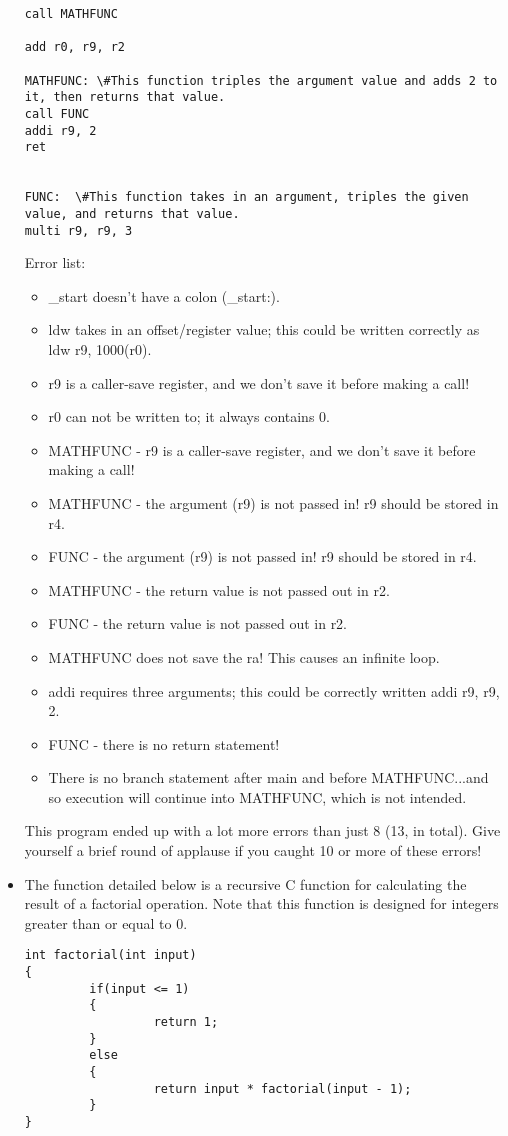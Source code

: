 \documentclass[10pt]{article}
\begin{document}
\begin{itemize}
\begin{verbatim}
call MATHFUNC

add r0, r9, r2

MATHFUNC: \#This function triples the argument value and adds 2 to it, then returns that value.
call FUNC
addi r9, 2
ret


FUNC:  \#This function takes in an argument, triples the given value, and returns that value.
multi r9, r9, 3
    \end{verbatim}

Error list:
\begin{itemize}
\item \_start doesn't have a colon (\_start:).
\item ldw takes in an offset/register value; this could be written correctly as ldw r9, 1000(r0).
\item r9 is a caller-save register, and we don't save it before making a call!
\item r0 can not be written to; it always contains 0.
\item MATHFUNC - r9 is a caller-save register, and we don't save it before making a call!
\item MATHFUNC - the argument (r9) is not passed in!  r9 should be stored in r4.
\item FUNC - the argument (r9) is not passed in!  r9 should be stored in r4.
\item MATHFUNC - the return value is not passed out in r2.
\item FUNC - the return value is not passed out in r2.
\item MATHFUNC does not save the ra!  This causes an infinite loop.
\item addi requires three arguments; this could be correctly written addi r9, r9, 2.
\item FUNC - there is no return statement!
\item There is no branch statement after main and before MATHFUNC...and so execution will continue into MATHFUNC, which is not intended.

\end{itemize}

This program ended up with a lot more errors than just 8 (13, in total).  Give yourself a brief round of applause if you caught 10 or more of these errors!

    \vspace{1in}

\item The function detailed below is a recursive C function for calculating the result of a factorial operation.  Note that this function is designed for integers greater than or equal to 0.
    \begin{verbatim}
int factorial(int input)
{
         if(input <= 1)
         {
                  return 1;
         }
         else
         {
                  return input * factorial(input - 1);
         }
}
    \end{verbatim}


\end{itemize}
\end{document}
